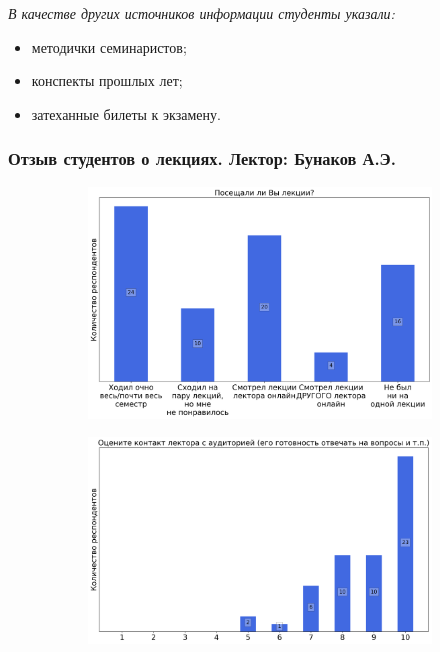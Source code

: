 		\textit{В качестве других источников информации студенты указали:} 
		\begin{itemize}
			\item методички семинаристов;
			\item конспекты прошлых лет;
			\item затеханные билеты к экзамену.
		\end{itemize}

	\subsubsection{Отзыв студентов о лекциях. Лектор: Бунаков А.Э.}

		\begin{figure}[H]
			\centering
            \begin{subfigure}[b]{0.45\textwidth}
				\centering
				\includegraphics[width=\textwidth]{images/3 course/ТФКП/lecturer-questions-Бунаков А.Э.-0.png}
			\end{subfigure}
			\begin{subfigure}[b]{0.45\textwidth}
				\centering
				\includegraphics[width=\textwidth]{images/3 course/ТФКП/lecturer-marks-Бунаков А.Э.-0.png}

\end{subfigure}
\end{figure}

